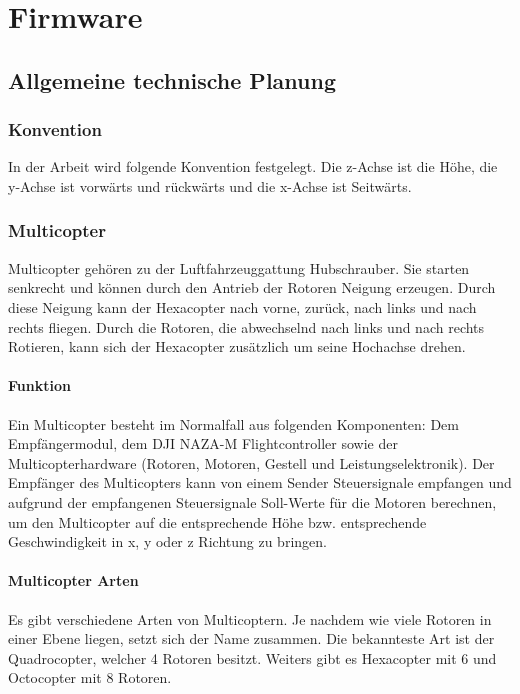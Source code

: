 \chapter{Firmware}
\renewcommand{\kapitelautor}{Autor: Christina Bornberg, Lucas Ullrich}

\section{Allgemeine technische Planung}

  \subsection{Konvention}
  In der Arbeit wird folgende Konvention festgelegt. Die z-Achse ist die Höhe, die y-Achse ist vorwärts und rückwärts und die x-Achse ist Seitwärts.


  \subsection{Multicopter}
  Multicopter gehören zu der Luftfahrzeuggattung Hubschrauber. Sie starten senkrecht und können durch den Antrieb der Rotoren Neigung erzeugen. Durch diese Neigung kann der Hexacopter nach vorne, zurück, nach links und nach rechts fliegen. Durch die Rotoren, die abwechselnd nach links und nach rechts Rotieren, kann sich der Hexacopter zusätzlich um seine Hochachse drehen.

  \subsubsection{Funktion}
  Ein Multicopter besteht im Normalfall aus folgenden Komponenten:
  Dem Empfängermodul, dem DJI NAZA-M Flightcontroller sowie der Multicopterhardware (Rotoren, Motoren, Gestell und Leistungselektronik). Der Empfänger des Multicopters kann von einem Sender Steuersignale empfangen und aufgrund der empfangenen Steuersignale Soll-Werte für die Motoren berechnen, um den Multicopter auf die entsprechende Höhe bzw. entsprechende Geschwindigkeit in x, y oder z Richtung zu bringen.


  \subsubsection{Multicopter Arten}
  Es gibt verschiedene Arten von Multicoptern. 
  Je nachdem wie viele Rotoren in einer Ebene liegen, setzt sich der Name zusammen.
  Die bekannteste Art ist der Quadrocopter, welcher 4 Rotoren besitzt. Weiters gibt es Hexacopter mit 6 und Octocopter mit 8 Rotoren. \cite{GrundlagenMulticopter}

